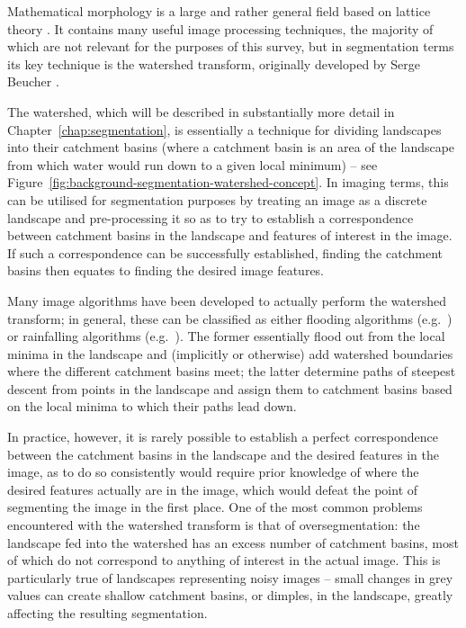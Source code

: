 Mathematical morphology is a large and rather general field based on lattice theory \cite{?}. It contains many useful image processing techniques, the majority of which are not relevant for the purposes of this survey, but in segmentation terms its key technique is the watershed transform, originally developed by Serge Beucher \cite{beucher90}.

The watershed, which will be described in substantially more detail in Chapter~\ref{chap:segmentation}, is essentially a technique for dividing landscapes into their catchment basins (where a catchment basin is an area of the landscape from which water would run down to a given local minimum) -- see Figure~\ref{fig:background-segmentation-watershed-concept}. In imaging terms, this can be utilised for segmentation purposes by treating an image as a discrete landscape and pre-processing it so as to try to establish a correspondence between catchment basins in the landscape and features of interest in the image. If such a correspondence can be successfully established, finding the catchment basins then equates to finding the desired image features.


Many image algorithms have been developed to actually perform the watershed transform; in general, these can be classified as either flooding algorithms (e.g.~\cite{bieniek00,rambabu07}) or rainfalling algorithms (e.g.~\cite{meijster98,osma-ruiz06,stoev00}). The former essentially flood out from the local minima in the landscape and (implicitly or otherwise) add watershed boundaries where the different catchment basins meet; the latter determine paths of steepest descent from points in the landscape and assign them to catchment basins based on the local minima to which their paths lead down.

In practice, however, it is rarely possible to establish a perfect correspondence between the catchment basins in the landscape and the desired features in the image, as to do so consistently would require prior knowledge of where the desired features actually are in the image, which would defeat the point of segmenting the image in the first place. One of the most common problems encountered with the watershed transform is that of oversegmentation: the landscape fed into the watershed has an excess number of catchment basins, most of which do not correspond to anything of interest in the actual image. This is particularly true of landscapes representing noisy images -- small changes in grey values can create shallow catchment basins, or dimples, in the landscape, greatly affecting the resulting segmentation.

